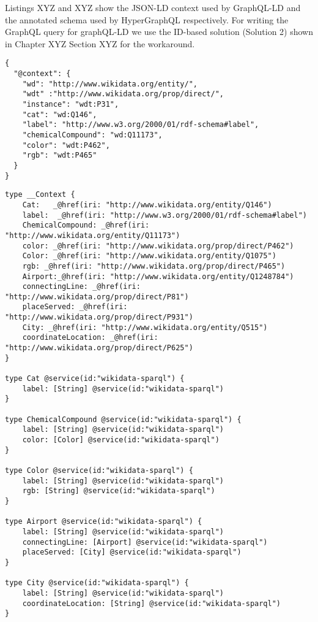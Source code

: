 Listings XYZ and XYZ show the JSON-LD context used by GraphQL-LD and the annotated schema used by HyperGraphQL respectively. For writing the GraphQL query for graphQL-LD we use the ID-based solution (Solution 2) shown in Chapter XYZ Section XYZ for the workaround.


\begin{minipage}{\linewidth}
\begin{lstlisting}[label=listing:listing34, caption={JSON-LD Context}]
{
  "@context": {
    "wd": "http://www.wikidata.org/entity/",
    "wdt" :"http://www.wikidata.org/prop/direct/",
    "instance": "wdt:P31",
    "cat": "wd:Q146",
    "label": "http://www.w3.org/2000/01/rdf-schema#label",
    "chemicalCompound": "wd:Q11173",
    "color": "wdt:P462",
    "rgb": "wdt:P465"
  }
}
\end{lstlisting}
\end{minipage}


\begin{minipage}{\linewidth}
\begin{lstlisting}[label=listing:listing34, caption={HyperGraphQL Annotated Scehma}]
type __Context {
    Cat:   _@href(iri: "http://www.wikidata.org/entity/Q146")
    label:  _@href(iri: "http://www.w3.org/2000/01/rdf-schema#label")
    ChemicalCompound: _@href(iri: "http://www.wikidata.org/entity/Q11173")
    color: _@href(iri: "http://www.wikidata.org/prop/direct/P462")
    Color: _@href(iri: "http://www.wikidata.org/entity/Q1075")
    rgb: _@href(iri: "http://www.wikidata.org/prop/direct/P465")
    Airport:_@href(iri: "http://www.wikidata.org/entity/Q1248784")
    connectingLine: _@href(iri: "http://www.wikidata.org/prop/direct/P81")
    placeServed: _@href(iri: "http://www.wikidata.org/prop/direct/P931")
    City: _@href(iri: "http://www.wikidata.org/entity/Q515")
    coordinateLocation: _@href(iri: "http://www.wikidata.org/prop/direct/P625")
}

type Cat @service(id:"wikidata-sparql") {
    label: [String] @service(id:"wikidata-sparql")
}

type ChemicalCompound @service(id:"wikidata-sparql") {
    label: [String] @service(id:"wikidata-sparql")
    color: [Color] @service(id:"wikidata-sparql")
}

type Color @service(id:"wikidata-sparql") {
    label: [String] @service(id:"wikidata-sparql")
    rgb: [String] @service(id:"wikidata-sparql")
}

type Airport @service(id:"wikidata-sparql") {
    label: [String] @service(id:"wikidata-sparql")
    connectingLine: [Airport] @service(id:"wikidata-sparql")
    placeServed: [City] @service(id:"wikidata-sparql")
}

type City @service(id:"wikidata-sparql") {
    label: [String] @service(id:"wikidata-sparql")
    coordinateLocation: [String] @service(id:"wikidata-sparql")
}
\end{lstlisting}
\end{minipage}

